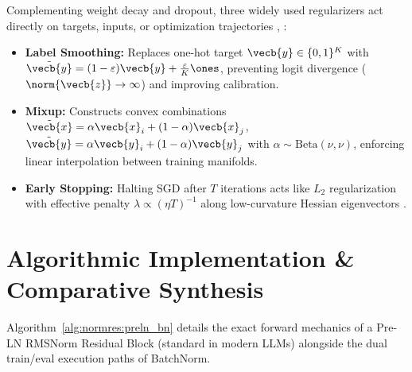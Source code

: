 \documentclass[../../../../master.tex]{subfiles}
\begin{document}
Complementing weight decay and dropout, three widely used regularizers act directly on targets, inputs, or optimization trajectories , :
\begin{itemize}
  \item \textbf{Label Smoothing:} Replaces one-hot target $\vecb{y} \in \{0,1\}^K$ with $\tilde{\vecb{y}} = (1 - \varepsilon)\vecb{y} + \frac{\varepsilon}{K}\ones$, preventing logit divergence ($\norm{\vecb{z}} \to \infty$) and improving calibration.
  \item \textbf{Mixup:} Constructs convex combinations $\tilde{\vecb{x}} = \alpha\vecb{x}_i + (1-\alpha)\vecb{x}_j$, $\tilde{\vecb{y}} = \alpha\vecb{y}_i + (1-\alpha)\vecb{y}_j$ with $\alpha \sim \mathrm{Beta}(\nu,\nu)$, enforcing linear interpolation between training manifolds.
  \item \textbf{Early Stopping:} Halting SGD after $T$ iterations acts like $L_2$ regularization with effective penalty $\lambda \propto (\eta T)^{-1}$ along low-curvature Hessian eigenvectors \newline{}.
\end{itemize}

\section{Algorithmic Implementation \& Comparative Synthesis}
\label{sec:normres:algorithms}

Algorithm~\ref{alg:normres:preln_bn} details the exact forward mechanics of a Pre-LN RMSNorm Residual Block (standard in modern LLMs) alongside the dual train/eval execution paths of BatchNorm.
\end{document}
